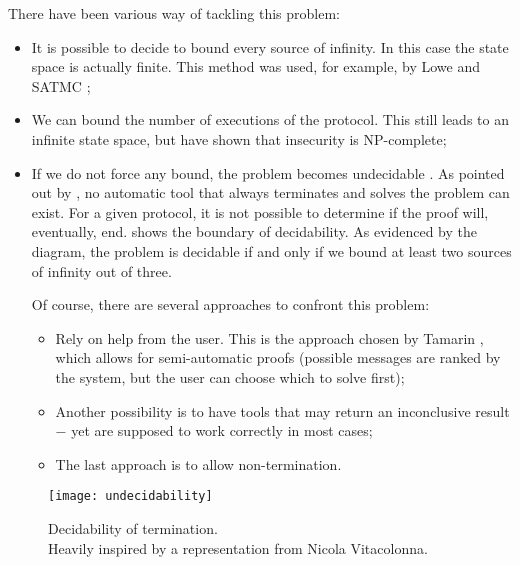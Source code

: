 There have been various way of tackling this problem:
\begin{itemize}
    \item{It is possible to decide to bound every source of infinity. In this case the state space is actually finite. This method was used, for example, by Lowe \cite{LoweNeedhamSchroederPK} and SATMC \cite{SATMC};}

    \item{We can bound the number of executions of the protocol. This still leads to an infinite state space, but \cite{SymbolicModelNPCompleteInsecurity} have shown that insecurity is NP-complete;}
    
    \item{If we do not force any bound, the problem becomes undecidable \cite{SymbolicModelUndecidability1} \cite{SymbolicModelUndecidability2}. As pointed out by \cite{SymbolicVerificationBlanchet}, no automatic tool that always terminates and solves the problem can exist. For a given protocol, it is not possible to determine if the proof will, eventually, end.  shows the boundary of decidability. As evidenced by the diagram, the problem is decidable if and only if we bound at least two sources of infinity out of three.

    Of course, there are several approaches to confront this problem:

    \begin{itemize}
        \item{Rely on help from the user. This is the approach chosen by Tamarin \cite{TamarinFoundations}, which allows for semi-automatic proofs (possible messages are ranked by the system, but the user can choose which to solve first);}
        \item{Another possibility is to have tools that may return an inconclusive result $-$ yet are supposed to work correctly in most cases;}
        \item{The last approach is to allow non-termination.}
    \end{itemize}
    }
\end{itemize}


\begin{figure}[t]
    \texttt{[image: undecidability]}
    \centering
    \caption{Decidability of termination.\\Heavily inspired by a representation from Nicola Vitacolonna.}
    \label{fig:undecidability}
\end{figure}






